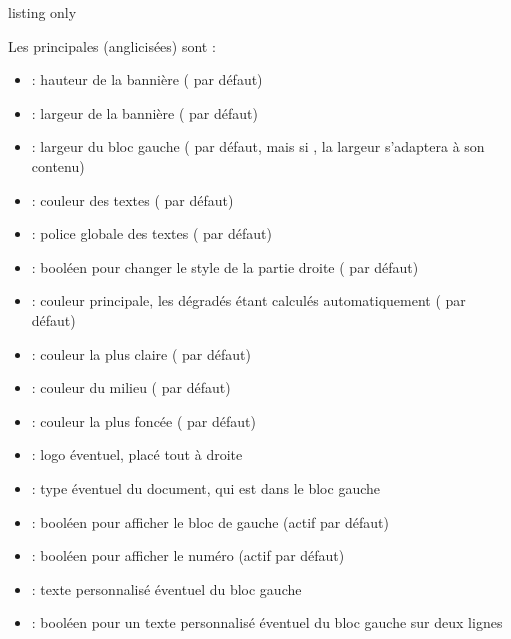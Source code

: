 \documentclass[french,11pt,a4paper]{article}
\begin{document}
\begin{DemoCode}{listing only}
\end{DemoCode}

\begin{DemoCode}{}
\end{DemoCode}

Les principales  (anglicisées) sont :

\begin{itemize}
	\item {} : hauteur de la bannière (\MontreCode{2.5em} par défaut)
	\item {} : largeur de la bannière ( par défaut)
	\item {} : largeur du bloc gauche (\MontreCode{2.75em} par défaut, mais si , la largeur s'adaptera à son contenu)
	\item {} : couleur des textes ( par défaut)
	\item {} : police globale des textes ( par défaut)
	\item {} : booléen pour changer le style de la partie droite ( par défaut)
	\item {} : couleur principale, les dégradés étant calculés automatiquement ( par défaut)
	\item {} : couleur la plus claire ( par défaut)
	\item {} : couleur du milieu ( par défaut)
	\item {} : couleur la plus foncée ( par défaut)
	\item {} : logo éventuel, placé tout à droite
	\item {} : type éventuel du document, qui est dans le bloc gauche
	\item {} : booléen pour afficher le bloc de gauche (actif par défaut)
	\item {} : booléen pour afficher le numéro (actif par défaut)
	\item {} : texte personnalisé éventuel du bloc gauche
	\item {} : booléen pour un texte personnalisé éventuel du bloc gauche sur deux lignes
\end{itemize}
\end{document}
